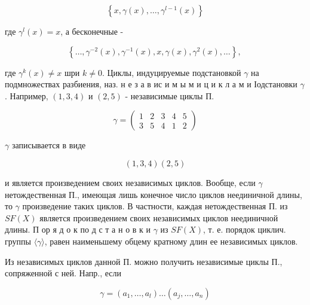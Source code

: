 \documentclass[10pt]{article}
\begin{document}
\[

\left\{x, \gamma(x), \ldots, \gamma^{l-1}(x)\right\}

\]



где $\gamma^{l}(x)=x$, а бесконечные -



\[

\left\{\ldots, \gamma^{-2}(x), \gamma^{-1}(x), x, \gamma(x), \gamma^{2}(x), \ldots\right\} \text {, }

\]



где $\gamma^{k}(x) \neq x$ шри $k \neq 0$. Циклы, индуцируемые подстановкой $\gamma$ на подмножествах разбиения, наз. н е з а в ис и м ы м и ц и к л а м и Іодстановки $\gamma$. Например, $(1,3,4)$ и $(2,5)$ - независимые циклы П.



\[

\gamma=\left(\begin{array}{lllll}

1 & 2 & 3 & 4 & 5 \\

3 & 5 & 4 & 1 & 2

\end{array}\right)

\]



$\gamma$ записывается в виде



\[

(1,3,4)(2,5)

\]



и является произведением своих независимых циклов. Вообще, если $\gamma$ нетождественная П., имеющая лишь конечное число циклов неединичной длины, то $\gamma$ произведение таких циклов. В частности, каждая нетождественная П. из $S F(X)$ является произведением своих независимых циклов неединичной длины. П ор я д о к по д с т а н о в к и $\gamma$ из $S F(X)$, т. е. порядок циклич. группы $\langle\gamma\rangle$, равен наименьшему обцему кратному длин ее независимых циклов.



Из независимых циклов данной П. можно получить независимые циклы П., сопряженной с ней. Напр., если



\[

\gamma=\left(a_{1}, \ldots, a_{l}\right) \ldots\left(a_{j}, \ldots, a_{n}\right)

\]
\end{document}
